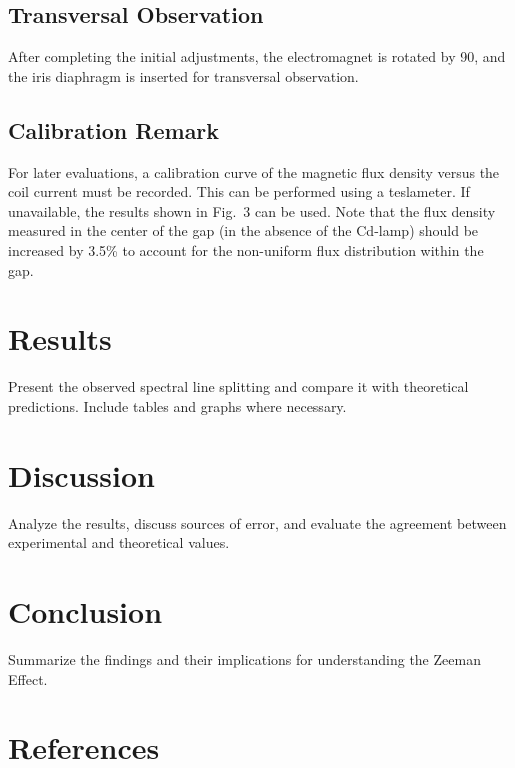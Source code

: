 \documentclass[a4paper,12pt]{article}
\begin{document}
\subsection{Transversal Observation}
    After completing the initial adjustments, the electromagnet is rotated by 90\textdegree, and the iris diaphragm is inserted for transversal observation.
    
    \subsection{Calibration Remark}
    For later evaluations, a calibration curve of the magnetic flux density versus the coil current must be recorded. This can be performed using a teslameter. If unavailable, the results shown in Fig.~3 can be used. Note that the flux density measured in the center of the gap (in the absence of the Cd-lamp) should be increased by 3.5\% to account for the non-uniform flux distribution within the gap.
    
    

\section{Results}
Present the observed spectral line splitting and compare it with theoretical predictions. Include tables and graphs where necessary.

\section{Discussion}
Analyze the results, discuss sources of error, and evaluate the agreement between experimental and theoretical values.

\section{Conclusion}
Summarize the findings and their implications for understanding the Zeeman Effect.

\section*{References}
\printbibliography
\end{document}
